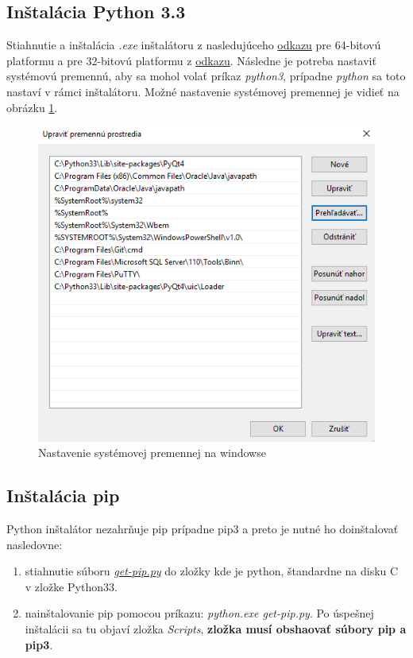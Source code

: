 \subsection{Inštalácia Python 3.3}
Stiahnutie a inštalácia \textit{.exe} inštalátoru z nasledujúceho \href{http://www.python.org/ftp/python/3.3.5/python-3.3.5.amd64.msi}{odkazu} pre 64-bitovú platformu a pre 32-bitovú platformu z \href{http://www.python.org/ftp/python/3.3.5/python-3.3.5.msi}{odkazu}. Následne je potreba nastaviť systémovú premennú, aby sa mohol volať príkaz \textit{python3}, prípadne \textit{python} sa toto nastaví v rámci inštalátoru. 
Možné nastavenie systémovej premennej je vidieť na obrázku \ref{fig:premenna}.
\begin{figure}[H]
\centering
\includegraphics[scale=0.6]{../text/premenna.png}
\caption{Nastavenie systémovej premennej na windowse}
\label{fig:premenna}
\end{figure}
\subsection{Inštalácia pip}
Python inštalátor nezahrňuje pip prípadne pip3 a preto je nutné ho doinštalovať nasledovne:
\begin{enumerate}
\item stiahnutie súboru \href{https://bootstrap.pypa.io/get-pip.py}{\textit{get-pip.py}} do zložky kde je python, štandardne na disku C v zložke Python33. 
\item nainštalovanie pip pomocou príkazu: \textit{python.exe get-pip.py}. Po úspešnej inštalácii sa tu objaví zložka \textit{Scripts}, \textbf{zložka musí obshaovať súbory pip a pip3}.
\end{enumerate}

